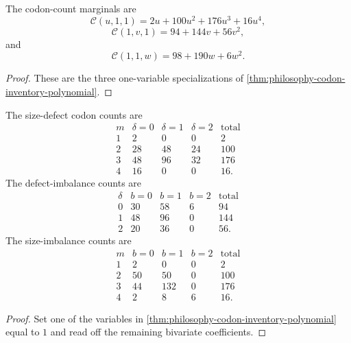 \begin{corollary}
\label{cor:philosophy-orbit-inventory-marginals}
The codon-count marginals are
$$
  \mathcal{C}(u,1,1)
  =
  2u+100u^{2}+176u^{3}+16u^{4},
$$
$$
  \mathcal{C}(1,v,1)
  =
  94+144v+56v^{2},
$$
and
$$
  \mathcal{C}(1,1,w)
  =
  98+190w+6w^{2}.
$$
\end{corollary}
\begin{proof}
These are the three one-variable specializations of
\autoref{thm:philosophy-codon-inventory-polynomial}.
\end{proof}

\begin{corollary}
\label{cor:philosophy-orbit-inventory-joint-tables}
The size-defect codon counts are
$$
\begin{array}{c|r|r|r|r}
  m & \delta=0 & \delta=1 & \delta=2 & \text{total}\\
  \hline
  1 & 2 & 0 & 0 & 2\\
  2 & 28 & 48 & 24 & 100\\
  3 & 48 & 96 & 32 & 176\\
  4 & 16 & 0 & 0 & 16.
\end{array}
$$
The defect-imbalance counts are
$$
\begin{array}{c|r|r|r|r}
  \delta & b=0 & b=1 & b=2 & \text{total}\\
  \hline
  0 & 30 & 58 & 6 & 94\\
  1 & 48 & 96 & 0 & 144\\
  2 & 20 & 36 & 0 & 56.
\end{array}
$$
The size-imbalance counts are
$$
\begin{array}{c|r|r|r|r}
  m & b=0 & b=1 & b=2 & \text{total}\\
  \hline
  1 & 2 & 0 & 0 & 2\\
  2 & 50 & 50 & 0 & 100\\
  3 & 44 & 132 & 0 & 176\\
  4 & 2 & 8 & 6 & 16.
\end{array}
$$
\end{corollary}
\begin{proof}
Set one of the variables in
\autoref{thm:philosophy-codon-inventory-polynomial} equal to $1$ and
read off the remaining bivariate coefficients.
\end{proof}

